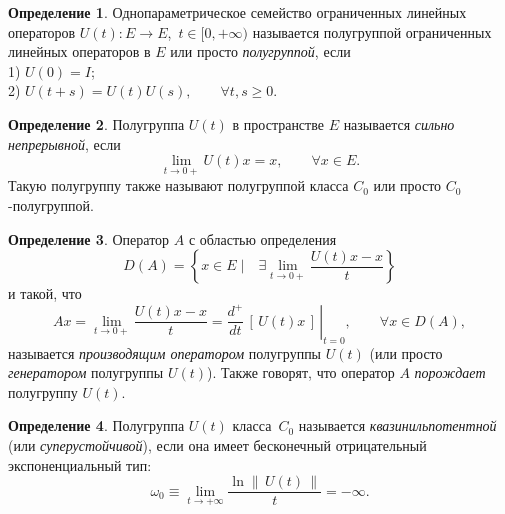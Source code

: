 \documentclass{article}
\renewcommand{\ge}{\geqslant}
\theoremstyle{definition}
\newtheorem{definition}{Определение}
\begin{document}
\begin{definition} \label{semigroup}
	Однопараметрическое семейство ограниченных линейных операторов $ U(t): E \rightarrow E $, $\, t \in [0, +\infty) $ 
	называется полугруппой ограниченных линейных операторов в $E$ или просто \textit{полугруппой}, если \\
	1) $ U(0) = I $; \\
	2) $ U(t + s) = U(t)U(s), \qquad \forall t, s \ge 0 $.
\end{definition}

\begin{definition} \label{strongly continious semigroup}
	Полугруппа $ U(t)$ в пространстве $ E $ называется \textit{сильно непрерывной}, если 
	\begin{equation*}
		\lim\limits_{t \rightarrow 0+} U(t)x = x, \qquad \forall x \in E.
	\end{equation*}
	Такую полугруппу также называют полугруппой класса $ C_0 $ или просто \linebreak $ C_0\, $-полугруппой.
\end{definition}

\begin{definition} \label{generator}
	Оператор $A$ с областью определения
	\begin{equation*}
		D(A) = \left\{ x \in E \; \bigg| \quad \exists \lim\limits_{t \rightarrow 0+} \frac{U(t)x - x}{t} \right\} 
	\end{equation*}
	и такой, что
	\begin{equation*}
		Ax = \lim\limits_{t \rightarrow 0+} \frac{U(t)x - x}{t} = \left. \frac{d^+}{dt}\,[\, U(t) x \,] \,\right|_{t = 0}, 
		\qquad \forall x \in D(A),
	\end{equation*}
	называется \textit{производящим оператором} полугруппы $U(t)$ (или просто \textit{генератором} полугруппы $U(t)$).
	Также говорят, что оператор $ A $ \textit{порождает} полугруппу $U(t)$.
\end{definition}

\begin{definition} \label{quasi-nilpotent semigroup}
	Полугруппа $U(t)$ класса~$C_0$ называется \textit{квазинильпотентной} (или \textit{суперустойчивой}), 
	если она имеет бесконечный отрицательный экспоненциальный тип:
	\begin{equation*}
		\omega_0 \equiv \lim\limits_{t \rightarrow +\infty} \frac{\ln \|\, U(t) \, \|}{t} = -\infty.
	\end{equation*}
\end{definition}
\end{document}
